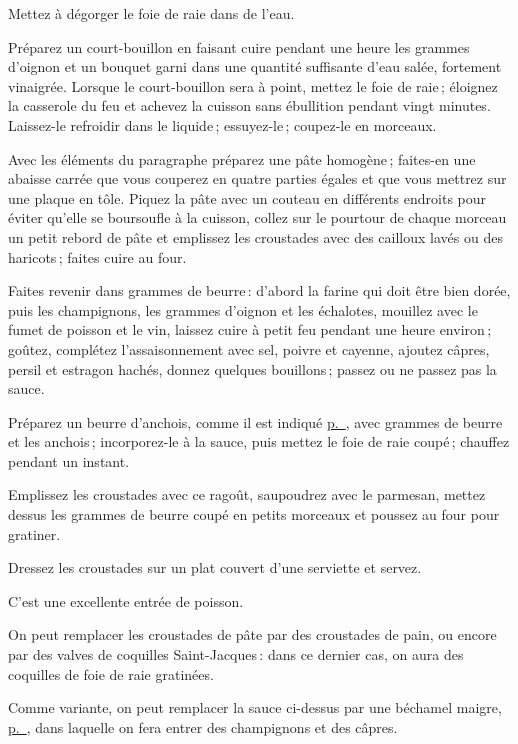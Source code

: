 Mettez à dégorger le foie de raie dans de l'eau.

Préparez un court-bouillon en faisant cuire pendant une heure les {\mmm}
grammes d'oignon et un bouquet garni dans une quantité suffisante d'eau salée,
fortement vinaigrée. Lorsque le court-bouillon sera à point, mettez le foie de
raie ; éloignez la casserole du feu et achevez la cuisson sans ébullition
pendant vingt minutes. Laissez-le refroidir dans le liquide ; essuyez-le ;
coupez-le en morceaux.

Avec les éléments du paragraphe {\mmm} préparez une pâte homogène ;
faites-en une abaisse carrée que vous couperez en quatre parties égales et que
vous mettrez sur une plaque en tôle. Piquez la pâte avec un couteau en
différents endroits pour éviter qu'elle se boursoufle à la cuisson, collez sur
le pourtour de chaque morceau un petit rebord de pâte et emplissez les
croustades avec des cailloux lavés ou des haricots ; faites cuire au four.

Faites revenir dans {\mmm} grammes de beurre : d'abord la farine qui doit
être bien dorée, puis les champignons, les {\mmm} grammes d'oignon et les
échalotes, mouillez avec le fumet de poisson et le vin, laissez cuire à petit
feu pendant une heure environ ; goûtez, complétez l'assaisonnement avec sel,
poivre et cayenne, ajoutez câpres, persil et estragon hachés, donnez quelques
bouillons ; passez ou ne passez pas la sauce.

Préparez un beurre d'anchois, comme il est indiqué
\hyperlink{p0337}{p. \pageref{pg0337}}, avec {\mmm} grammes de beurre et les
anchois ; incorporez-le à la sauce, puis mettez le foie de raie coupé ;
chauffez pendant un instant.

Emplissez les croustades avec ce ragoût, saupoudrez avec le parmesan, mettez
dessus les {\mmm} grammes de beurre coupé en petits morceaux et poussez
au four pour gratiner.

Dressez les croustades sur un plat couvert d’une serviette et servez.

C'est une excellente entrée de poisson.

\sk

On peut remplacer les croustades de pâte par des croustades de pain, ou encore
par des valves de coquilles Saint-Jacques : dans ce dernier cas, on aura des
coquilles de foie de raie gratinées.

\sk

Comme variante, on peut remplacer la sauce ci-dessus par une béchamel maigre,
\hyperlink{p0269}{p. \pageref{pg0269}}, dans laquelle on fera entrer des
champignons et des câpres.
